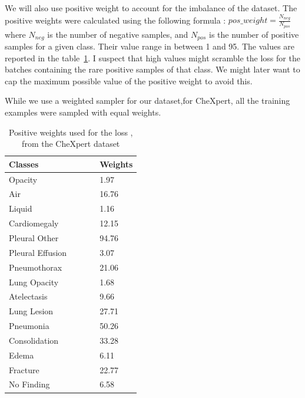 \documentclass[11pt]{article}
\begin{document}
            We will also use positive weight to account for the imbalance of the dataset. The positive weights were calculated using the following formula : $pos\_weight = \frac{N_{neg}}{N_{pos}}$ where $N_{neg}$ is the number of negative samples, and $N_{pos}$ is the number of positive samples for a given class. Their value range
        in between 1 and 95. The values are reported in the table~\ref{table:pos_weight_chexpert}. I suspect that high values might scramble the loss for the batches containing the rare positive samples of that class. We might later want to cap
        the maximum possible value of the positive weight to avoid this.

        While we use a weighted sampler for our dataset,for CheXpert, all the training examples were sampled with equal weights.

            \begin{table}[h!]
                \centering
                \begin{tabular}{@{}lllll@{}}
                \toprule
                Classes          & & & & Weights \\ \midrule
                Opacity          & & & & 1.97    \\
                Air              & & & & 16.76   \\
                Liquid           & & & & 1.16    \\
                Cardiomegaly     & & & & 12.15   \\
                Pleural Other    & & & & 94.76   \\
                Pleural Effusion & & & & 3.07    \\
                Pneumothorax     & & & & 21.06   \\
                Lung Opacity     & & & & 1.68    \\
                Atelectasis      & & & & 9.66    \\
                Lung Lesion      & & & & 27.71   \\
                Pneumonia        & & & & 50.26   \\
                Consolidation    & & & & 33.28   \\
                Edema            & & & & 6.11    \\
                Fracture         & & & & 22.77   \\
                No Finding       & & & & 6.58    \\ \bottomrule
                \end{tabular}
                \caption{Positive weights used for the loss , from the CheXpert dataset}
                \label{table:pos_weight_chexpert}
            \end{table}
\end{document}
